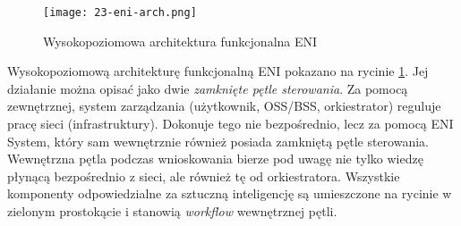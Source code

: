 \begin{figure}[!h]
    \centering \texttt{[image: 23-eni-arch.png]}
    \caption{Wysokopoziomowa architektura funkcjonalna ENI}\label{fig:23-eni-arch}
\end{figure}

Wysokopoziomową architekturę funkcjonalną ENI pokazano na rycinie \ref{fig:23-eni-arch}. Jej działanie można opisać jako dwie \textit{zamknięte pętle sterowania}. Za pomocą zewnętrznej, system zarządzania (użytkownik, OSS/BSS, orkiestrator) reguluje pracę sieci (infrastruktury). Dokonuje tego nie bezpośrednio, lecz za pomocą ENI System, który sam wewnętrznie również posiada zamkniętą pętle sterowania. Wewnętrzna pętla podczas wnioskowania bierze pod uwagę nie tylko wiedzę płynącą bezpośrednio z sieci, ale również tę od orkiestratora. Wszystkie komponenty odpowiedzialne za sztuczną inteligencję są umieszczone na rycinie w zielonym prostokącie i stanowią \textit{workflow} wewnętrznej pętli. 
